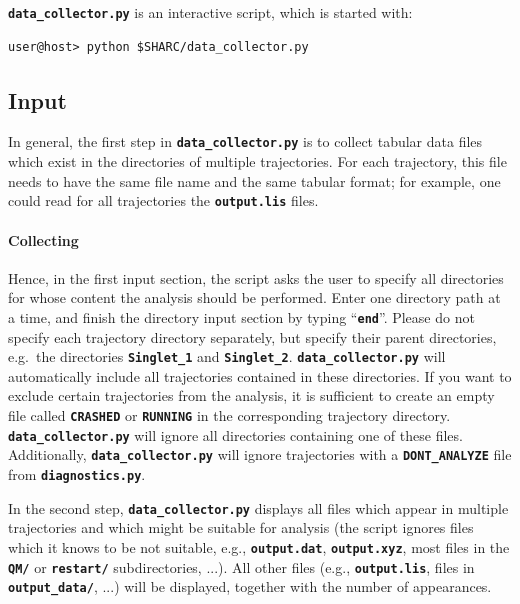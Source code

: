 \documentclass[a4paper,10pt,DIV=15,openany,twoside=false]{scrbook}
\newcommand{\ttt}[1]{\textbf{\texttt{#1}}}
\begin{document}
\ttt{data\_collector.py} is an interactive script, which is started with:
\begin{verbatim}
user@host> python $SHARC/data_collector.py
\end{verbatim}

\subsection{Input}

In general, the first step in \ttt{data\_collector.py} is to collect tabular data files which exist in the directories of multiple trajectories.
For each trajectory, this file needs to have the same file name and the same tabular format; for example, one could read for all trajectories the \ttt{output.lis} files.

\paragraph{Collecting}

Hence, in the first input section, the script asks the user to specify all directories for whose content the analysis should be performed. Enter one directory path at a time, and finish the directory input section by typing ``\ttt{end}''. Please do not specify each trajectory directory separately, but specify their parent directories, e.g.\ the directories \ttt{Singlet\_1} and \ttt{Singlet\_2}. \ttt{data\_collector.py} will automatically include all trajectories contained in these directories.
If you want to exclude certain trajectories from the analysis, it is sufficient to create an empty file called \ttt{CRASHED} or \ttt{RUNNING} in the corresponding trajectory directory. \ttt{data\_collector.py} will ignore all directories containing one of these files.
Additionally, \ttt{data\_collector.py} will ignore trajectories with a \ttt{DONT\_ANALYZE} file from \ttt{diagnostics.py}.

In the second step, \ttt{data\_collector.py} displays all files which appear in multiple trajectories and which might be suitable for analysis (the script ignores files which it knows to be not suitable, e.g., \ttt{output.dat}, \ttt{output.xyz}, most files in the \ttt{QM/} or \ttt{restart/} subdirectories, ...). 
All other files (e.g., \ttt{output.lis}, files in \ttt{output\_data/}, ...) will be displayed, together with the number of appearances.
\end{document}
